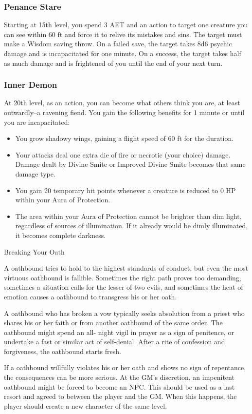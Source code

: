 \subsubsection{Penance Stare}
Starting at 15th level, you spend 3 AET and an action to target one creature you can see within 60 ft and force it to relive its mistakes and sins. The target must make a Wisdom saving throw. On a failed save, the target takes 8d6 psychic damage and is incapacitated for one minute. On a success, the target takes half as much damage and is frightened of you until the end of your next turn.

\subsubsection{Inner Demon}
At 20th level, as an action, you can become what others think you are, at least outwardly--a ravening fiend. You gain the following benefits for 1 minute or until you are incapacitated:
\begin{itemize}
	\item You grow shadowy wings, gaining a flight speed of 60 ft for the duration.
	\item Your attacks deal one extra die of fire or necrotic (your choice) damage. Damage dealt by Divine Smite or Improved Divine Smite becomes that same damage type.
	\item You gain 20 temporary hit points whenever a creature is reduced to 0 HP within your Aura of Protection.
	\item The area within your Aura of Protection cannot be brighter than dim light, regardless of sources of illumination. If it already would be dimly illuminated, it becomes complete darkness.
\end{itemize}

\begin{DndComment}{Breaking Your Oath}

A oathbound tries to hold to the highest standards of conduct, but even the most virtuous oathbound is fallible. Sometimes the right path proves too demanding, sometimes a situation calls for the lesser of two evils, and sometimes the heat of emotion causes a oathbound to transgress his or her oath.

A oathbound who has broken a vow typically seeks absolution from a priest who shares his or her faith or from another oathbound of the same order. The oathbound might spend an all- night vigil in prayer as a sign of penitence, or undertake a fast or similar act of self-denial. After a rite of confession and forgiveness, the oathbound starts fresh.

If a oathbound willfully violates his or her oath and shows no sign of repentance, the consequences can be more serious. At the GM's discretion, an impenitent oathbound might be forced to become an NPC. This should be used as a last resort and agreed to between the player and the GM. When this happens, the player should create a new character of the same level.
\end{DndComment}

